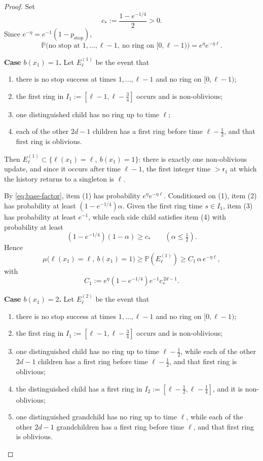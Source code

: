\documentclass[letterpaper,11pt,reqno]{amsart}
\theoremstyle{definition}
\begin{document}
\begin{proof}
Set
\[
c_*:=\frac{1-e^{-1/4}}{2}>0.
\]
Since \(e^{-\eta}=e^{-1}(1-p_{\mathrm{stop}})\),
\begin{equation}\label{eq:base-factor}
\mathbb P\big(\text{no stop at }1,\dots,\ell-1,\ \text{no ring on }[0,\ell-1)\big)
=
e^\eta e^{-\eta\ell}.
\end{equation}

\smallskip
\noindent\textbf{Case \(b(x_1)=1\).}
Let \(E^{(1)}_\ell\) be the event that

\begin{enumerate}
\item there is no stop success at times \(1,\dots,\ell-1\) and no ring on \([0,\ell-1)\);
\item the first ring in \(I_1:=[\ell-1,\ell-\tfrac34]\) occurs and is non-oblivious;
\item one distinguished child has no ring up to time \(\ell\);
\item each of the other \(2d-1\) children has a first ring before time \(\ell-\tfrac12\), and that first ring is oblivious.
\end{enumerate}

Then \(E^{(1)}_\ell\subset\{\ell(x_1)=\ell,\ b(x_1)=1\}\): there is exactly one non-oblivious update, and since it occurs after time \(\ell-1\), the first integer time \(>\mathsf r_1\) at which the history returns to a singleton is \(\ell\).

By \eqref{eq:base-factor}, item (1) has probability \(e^\eta e^{-\eta\ell}\). Conditioned on (1), item (2) has probability at least \((1-e^{-1/4})\alpha\). Given the first ring time \(s\in I_1\), item (3) has probability at least \(e^{-1}\), while each side child satisfies item (4) with probability at least
\[
(1-e^{-1/4})(1-\alpha)\ge c_*
\qquad(\alpha\le\tfrac12).
\]
Hence
\[
\mu\big(\ell(x_1)=\ell,\ b(x_1)=1\big)\ge \mathbb P(E^{(1)}_\ell)
\ge
C_1\,\alpha\,e^{-\eta\ell},
\]
with
\[
C_1:=e^\eta(1-e^{-1/4})e^{-1}c_*^{\,2d-1}.
\]

\smallskip
\noindent\textbf{Case \(b(x_1)=2\).}
Let \(E^{(2)}_\ell\) be the event that

\begin{enumerate}
\item there is no stop success at times \(1,\dots,\ell-1\) and no ring on \([0,\ell-1)\);
\item the first ring in \(I_1:=[\ell-1,\ell-\tfrac34]\) occurs and is non-oblivious;
\item one distinguished child has no ring up to time \(\ell-\tfrac12\), while each of the other \(2d-1\) children has a first ring before time \(\ell-\tfrac12\), and that first ring is oblivious;
\item the distinguished child has a first ring in \(I_2:=[\ell-\tfrac12,\ell-\tfrac14]\), and it is non-oblivious;
\item one distinguished grandchild has no ring up to time \(\ell\), while each of the other \(2d-1\) grandchildren has a first ring before time \(\ell\), and that first ring is oblivious.
\end{enumerate}


\end{proof}
\end{document}
